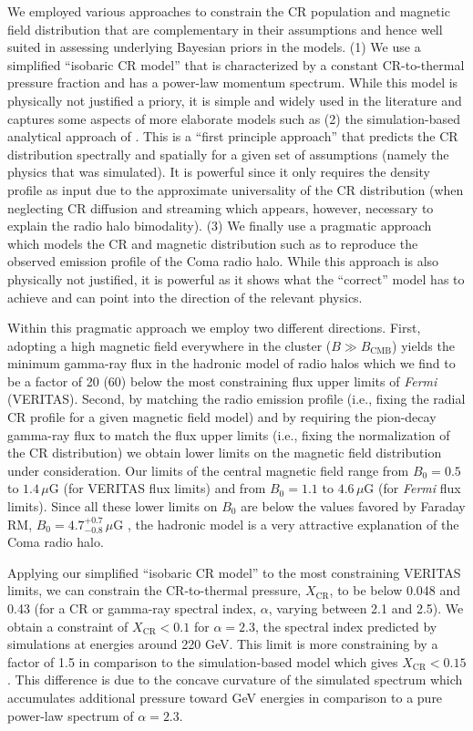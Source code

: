 \documentclass[12pt,manuscript]{aastex}
\newcommand{\rmn}{\mathrm}
\newcommand{\CR}{\mathrm{CR}}
\begin{document}
We employed various approaches to constrain the CR population and magnetic field distribution that
are complementary in their assumptions and hence well suited in assessing underlying Bayesian
priors in the models. (1) We use a simplified ``isobaric CR model'' that is characterized by a
constant CR-to-thermal pressure fraction and has a power-law momentum spectrum.  While this model
is physically not justified a priory, it is simple and widely used in the literature and captures
some aspects of more elaborate models such as (2) the simulation-based analytical approach of
\citet{article:PinzkePfrommer:2010}. This is a ``first principle approach'' that predicts the CR
distribution spectrally and spatially for a given set of assumptions (namely the physics that was
simulated). It is powerful since it only requires the density profile as input due to the
approximate universality of the CR distribution (when neglecting CR diffusion and streaming which
appears, however, necessary to explain the radio halo bimodality). (3) We finally use a pragmatic
approach which models the CR and magnetic distribution such as to reproduce the observed emission
profile of the Coma radio halo. While this approach is also physically not justified, it is
powerful as it shows what the ``correct'' model has to achieve and can point into the direction of
the relevant physics.

Within this pragmatic approach we employ two different directions. First, adopting a high magnetic
field everywhere in the cluster ($B\gg B_\rmn{CMB}$) yields the minimum gamma-ray flux in the
hadronic model of radio halos which we find to be a factor of 20 (60) below the most constraining
flux upper limits of {\em Fermi} (VERITAS). Second, by matching the radio emission profile (i.e.,
fixing the radial CR profile for a given magnetic field model) and by requiring the pion-decay
gamma-ray flux to match the flux upper limits (i.e., fixing the normalization of the CR
distribution) we obtain lower limits on the magnetic field distribution under consideration. Our
limits of the central magnetic field range from $B_{0} = 0.5$ to $1.4\,\mu$G (for VERITAS  flux
limits) and from $B_{0} = 1.1$ to $4.6\,\mu$G (for {\em Fermi} flux limits). Since all these lower
limits on $B_0$ are below the values favored by Faraday RM, $B_{0} = 4.7^{+0.7}_{-0.8}\,\mu$G
\citep{article:Bonafede_etal:2010}, the hadronic model is a very attractive explanation of the Coma
radio halo.

Applying our simplified ``isobaric CR model'' to the most constraining VERITAS limits, we can
constrain the CR-to-thermal pressure, $X_\CR$, to be below 0.048 and 0.43 (for a CR or gamma-ray
spectral index, $\alpha$, varying between 2.1 and 2.5). We obtain a constraint of $X_\CR<0.1$ for
$\alpha=2.3$, the spectral index predicted by simulations at energies around 220 GeV.  This limit
is more constraining by a factor of 1.5 in comparison to the simulation-based model which gives
$X_\CR<0.15$.  This difference is due to the concave curvature of the simulated spectrum which
accumulates additional pressure toward GeV energies in comparison to a pure power-law spectrum of
$\alpha=2.3$.
\end{document}
